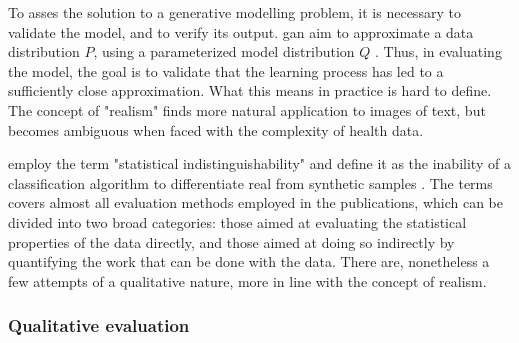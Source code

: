         To asses the solution to a generative modelling problem, it is necessary to validate the model, and to verify its output. \gls{gan} aim to approximate a data distribution $P$, using a parameterized model distribution $Q$ \cite{Borji2018-fy}. Thus, in evaluating the model, the goal is to validate that the learning process has led to a sufficiently close approximation. What this means in practice is hard to define. The concept of "realism" finds more natural application to images of text, but becomes ambiguous when faced with the complexity of health data.\par
        
        \citeauthor{walsh2020generating} employ the term "statistical indistinguishability" and define it as the inability of a classification algorithm to differentiate real from synthetic samples \cite{walsh2020generating}. The terms covers almost all evaluation methods employed in the publications, which can be divided into two broad categories: those aimed at evaluating the statistical properties of the data directly, and those aimed at doing so indirectly by quantifying the work that can be done with the data. There are, nonetheless a few attempts of a qualitative nature, more in line with the concept of realism. 

        \subsubsection{Qualitative evaluation}
        
